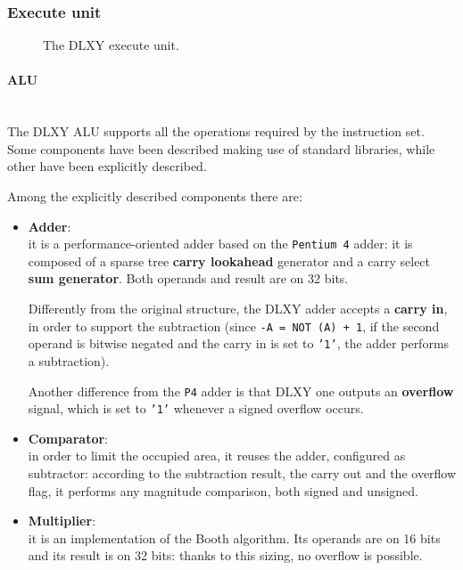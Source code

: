 \subsubsection{Execute unit}
\begin{figure}[H]
	\centering
	\caption{The DLXY execute unit.}
	\label{fig:execute_unit}
\end{figure}

\paragraph{ALU} \mbox{} \\
The DLXY ALU supports all the operations required by the instruction set.
Some components have been described making use of standard libraries, while
other have been explicitly described.

Among the explicitly described components there are:
\begin{itemize}
	\item \textbf{Adder}: \\
		it is a performance-oriented adder based on the \texttt{Pentium 4}
		adder: it is composed of a sparse tree \textbf{carry lookahead}
		generator and a carry select \textbf{sum generator}.
		Both operands and result are on 32 bits.

		Differently from the original structure, the DLXY adder accepts
		a \textbf{carry in}, in order to support the subtraction
		(since \texttt{-A = NOT (A) + 1}, if the second operand is
		bitwise negated and the carry in is set to \texttt{'1'}, the adder
		performs a subtraction).

		Another difference from the \texttt{P4} adder is that DLXY one
		outputs an \textbf{overflow} signal, which is set to \texttt{'1'}
		whenever a signed overflow occurs.
	\item \textbf{Comparator}: \\
		in order to limit the occupied area, it reuses the adder,
		configured as subtractor: according to the subtraction result,
		the carry out and the overflow flag, it performs any magnitude
		comparison, both signed and unsigned.
	\item \textbf{Multiplier}: \\
		it is an implementation of the Booth algorithm.
		Its operands are on 16 bits and its result is on 32 bits: thanks
		to this sizing, no overflow is possible.
\end{itemize}

